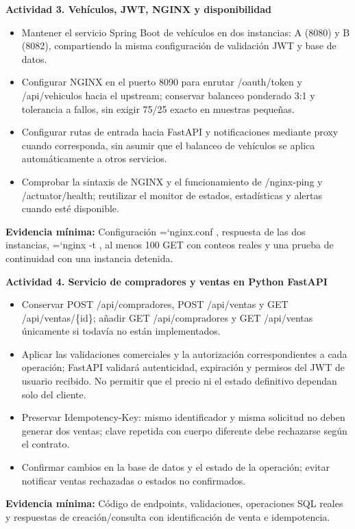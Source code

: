 \documentclass[11pt,a4paper]{article}
\renewcommand{\_}{\oldunderscore\allowbreak}
\DeclareRobustCommand{\texttt}[1]{%
  {\upshape\ttfamily\fontsize{9}{10.8}\selectfont\hyphenchar\font=`\-\relax #1}%
}
\begin{document}
\vspace{0.2cm}

\noindent\textbf{Actividad 3. Vehículos, JWT, NGINX y disponibilidad}
\begin{itemize}[leftmargin=*,itemsep=2pt,topsep=2pt]
  \item Mantener el servicio Spring Boot de vehículos en dos instancias: A (8080) y B (8082), compartiendo la misma configuración de validación JWT y base de datos.
  \item Configurar NGINX en el puerto 8090 para enrutar /oauth/token y /api/vehiculos hacia el upstream; conservar balanceo ponderado 3:1 y tolerancia a fallos, sin exigir 75/25 exacto en muestras pequeñas.
  \item Configurar rutas de entrada hacia FastAPI y notificaciones mediante proxy cuando corresponda, sin asumir que el balanceo de vehículos se aplica automáticamente a otros servicios.
  \item Comprobar la sintaxis de NGINX y el funcionamiento de /nginx-ping y /actuator/health; reutilizar el monitor de estados, estadísticas y alertas cuando esté disponible.
\end{itemize}
\textbf{Evidencia mínima:} Configuración \texttt{nginx.conf}, respuesta de las dos instancias, \texttt{nginx -t}, al menos 100 GET con conteos reales y una prueba de continuidad con una instancia detenida.

\vspace{0.2cm}

\noindent\textbf{Actividad 4. Servicio de compradores y ventas en Python FastAPI}
\begin{itemize}[leftmargin=*,itemsep=2pt,topsep=2pt]
  \item Conservar POST /api/compradores, POST /api/ventas y GET /api/ventas/\{id\}; añadir GET /api/compradores y GET /api/ventas únicamente si todavía no están implementados.
  \item Aplicar las validaciones comerciales y la autorización correspondientes a cada operación; FastAPI validará autenticidad, expiración y permisos del JWT de usuario recibido. No permitir que el precio ni el estado definitivo dependan solo del cliente.
  \item Preservar Idempotency-Key: mismo identificador y misma solicitud no deben generar dos ventas; clave repetida con cuerpo diferente debe rechazarse según el contrato.
  \item Confirmar cambios en la base de datos y el estado de la operación; evitar notificar ventas rechazadas o estados no confirmados.
\end{itemize}
\textbf{Evidencia mínima:} Código de endpoints, validaciones, operaciones SQL reales y respuestas de creación/consulta con identificación de venta e idempotencia.
\end{document}
